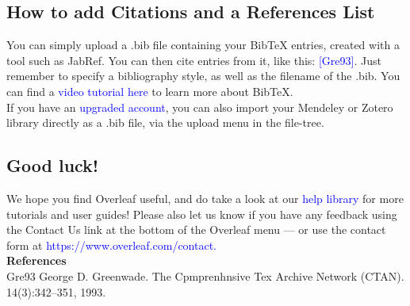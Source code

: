 \documentclass{article}
\begin{document}
    \subsection{How to add Citations and a References List}
    You can simply upload a .bib file containing your BibTeX entries, created with a tool such as JabRef. You can then cite entries from it, like this: \textcolor{blue}{[Gre93]}. Just remember to specify a bibliography style, as well as the filename of the .bib. You can find a \textcolor{blue}{video tutorial here} to learn more about BibTeX.\\
    \hspace{1cm}If you have an \textcolor{blue}{upgraded account}, you can also import your Mendeley or Zotero library directly as a .bib file, via the upload menu in the file-tree.
    
    \subsection{Good luck!}
    We hope you find Overleaf useful, and do take a look at our \textcolor{blue}{help library} for more tutorials and user
    guides! Please also let us know if you have any feedback using the Contact Us link at the bottom of
    the Overleaf menu — or use the contact form at \textcolor{blue}{https://www.overleaf.com/contact.}\\
    
    \textbf{References}\\
     Gre93 George D. Greenwade.    The Cpmprenhnsive Tex Archive Network (CTAN).
     14(3):342–351, 1993.
	
	
\end{document}
